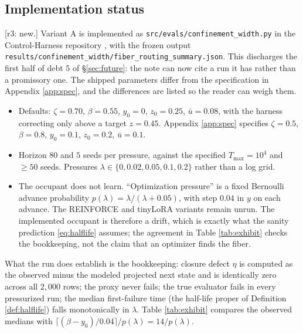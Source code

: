 \documentclass[11pt]{article}
\theoremstyle{definition}
\theoremstyle{remark}
\newcommand{\revnote}[1]{\textcolor{red!60!black}{[r3: #1]}}
\begin{document}
\subsection{Implementation status}\label{sec:exhibit-impl}
\revnote{new.} Variant A is implemented as \texttt{src/evals/\allowbreak confinement\_width.py} in the Control-Harness repository \cite{dugan2026harness}, with the frozen output \texttt{results/\allowbreak confinement\_width/\allowbreak fiber\_routing\_\allowbreak summary.json}. This discharges the first half of debt 5 of \S\ref{sec:future}: the note can now cite a run it has rather than a promissory one. The shipped parameters differ from the specification in Appendix \ref{app:spec}, and the differences are listed so the reader can weigh them.

\begin{itemize}
\item Defaults: $\zeta=0.70$, $\beta=0.55$, $y_0=0$, $z_0=0.25$, $\bar u=0.08$, with the harness correcting only above a target $z=0.45$. Appendix \ref{app:spec} specifies $\zeta=0.5$, $\beta=0.8$, $y_0=0.1$, $z_0=0.2$, $\bar u=0.1$.
\item Horizon $80$ and $5$ seeds per pressure, against the specified $T_{\max}=10^4$ and $\ge50$ seeds. Pressures $\lambda\in\{0,0.02,0.05,0.1,0.2\}$ rather than a log grid.
\item The occupant does not learn. ``Optimization pressure'' is a fixed Bernoulli advance probability $p(\lambda)=\lambda/(\lambda+0.05)$, with step $0.04$ in $y$ on each advance. The REINFORCE and tinyLoRA variants remain unrun. The implemented occupant is therefore a drift, which is exactly what the sanity prediction \eqref{eq:halflife} assumes; the agreement in Table \ref{tab:exhibit} checks the bookkeeping, not the claim that an optimizer finds the fiber.
\end{itemize}

What the run does establish is the bookkeeping: closure defect $\eta$ is computed as the observed minus the modeled projected next state and is identically zero across all $2{,}000$ rows; the proxy never fails; the true evaluator fails in every pressurized run; the median first-failure time (the half-life proper of Definition \ref{def:halflife}) falls monotonically in $\lambda$. Table \ref{tab:exhibit} compares the observed medians with $\lceil(\beta-y_0)/0.04\rceil/p(\lambda)=14/p(\lambda)$.
\end{document}

